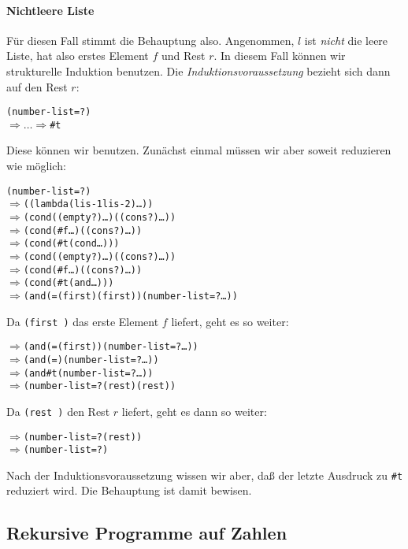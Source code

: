 \paragraph{Nichtleere Liste}
Für diesen Fall stimmt die Behauptung also.  Angenommen, $l$ ist
\emph{nicht} die leere Liste, hat also erstes Element $f$ und Rest
$r$.  In diesem Fall können wir strukturelle Induktion benutzen.  Die
\emph{Induktionsvoraussetzung} bezieht sich dann auf den Rest $r$:
%
\begin{alltt}
(number-list=?  )
\(\Longrightarrow\ldots\Longrightarrow\) #t
\end{alltt}
%
Diese können wir benutzen.  Zunächst einmal müssen wir aber soweit
reduzieren wie möglich:
%
\begin{alltt}
(number-list=?  )
\(\Longrightarrow\) ((lambda (lis-1 lis-2) \ldots{})  )
\(\Longrightarrow\) (cond ((empty? ) \ldots) ((cons? ) \ldots))
\(\Longrightarrow\) (cond (#f \ldots) ((cons? ) \ldots))
\(\Longrightarrow\) (cond (#t (cond \ldots)))
\(\Longrightarrow\) (cond ((empty? ) \ldots) ((cons? ) \ldots))
\(\Longrightarrow\) (cond (#f \ldots) ((cons? ) \ldots))
\(\Longrightarrow\) (cond (#t (and \ldots)))
\(\Longrightarrow\) (and (= (first ) (first )) (number-list=? \ldots))
\end{alltt}
%
Da \texttt{(first )} das erste Element $f$ liefert, geht es
so weiter:
\begin{alltt}
\(\Longrightarrow\) (and (=  (first )) (number-list=? \ldots))
\(\Longrightarrow\) (and (=  ) (number-list=? \ldots))
\(\Longrightarrow\) (and #t (number-list=? \ldots))
\(\Longrightarrow\) (number-list=? (rest ) (rest ))
\end{alltt}
%
Da \texttt{(rest )} den Rest $r$ liefert, geht es dann so
weiter:
%
\begin{alltt}
\(\Longrightarrow\) (number-list=?  (rest ))
\(\Longrightarrow\) (number-list=?  )
\end{alltt}
%
Nach der Induktionsvoraussetzung wissen wir aber, daß der letzte
Ausdruck zu \verb|#t| reduziert wird.  Die Behauptung ist damit
bewisen.


\subsection{Rekursive Programme auf Zahlen}

